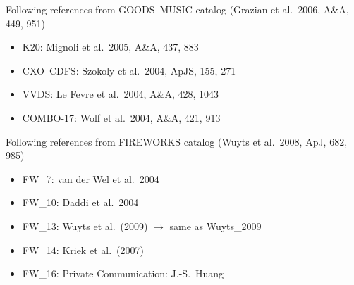 \documentclass[12pt,onecolumn]{article}
\begin{document}
\noindent Following references from GOODS--MUSIC catalog (Grazian et al.\ 2006, A\&A, 449, 951)
\begin{itemize}
\item K20: Mignoli et al.\ 2005, A\&A, 437, 883
\item CXO--CDFS: Szokoly et al.\ 2004, ApJS, 155, 271
\item VVDS: Le Fevre et al.\ 2004, A\&A, 428, 1043
\item COMBO-17: Wolf et al.\ 2004, A\&A, 421, 913
\end{itemize}


\noindent Following references from FIREWORKS catalog (Wuyts et al.\ 2008, ApJ, 682, 985)
\begin{itemize}
\item FW\_7: van der Wel et al.\ 2004
\item FW\_10: Daddi et al.\ 2004
\item FW\_13: Wuyts et al.\ (2009) $\rightarrow$ same as Wuyts\_2009
\item FW\_14: Kriek et al.\ (2007)
\item FW\_16: Private Communication: J.-S.\ Huang
\end{itemize}
\end{document}
